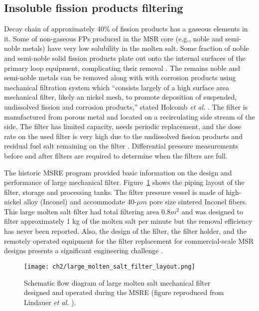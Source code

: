 \subsection{Insoluble fission products filtering}
Decay chain of approximately 40\% of fission products has a gaseous elements 
in it. Some of non-gaseous \glspl{FP} produced in the \gls{MSR} core (e.g., 
noble and semi-noble metals) have very low solubility in the molten salt. Some 
fraction of noble and semi-noble solid fission products plate out onto the 
internal surfaces of the primary loop equipment, complicating their removal 
\cite{briggs_molten-salt_1964}. The remains noble and semi-noble metals can be 
removed along with with corrosion products using mechanical filtration system 
which ``consists largely of a high surface area mechanical filter, likely an 
nickel mesh, to promote deposition of suspended, undissolved fission and 
corrosion products,'' stated Holcomb \emph{et al.} 
\cite{holcomb_instrumentation_2018}. The filter is manufactured from porous 
metal and located on a recirculating side stream of the side. The filter has 
limited capacity, needs periodic replacement, and the dose rate on the used 
filter is very high due to the undissolved fission products and residual 
fuel salt remaining on the filter \cite{mcfarlane_review_2019-1}. Differential 
pressure measurements before and after filters are required to determine when 
the filters are full. 

The historic \gls{MSRE} program provided basic information on the design and 
performance of large mechanical filter. Figure~\ref{fig:large_filter_layout} 
shows the piping layout of the filter, storage and processing tanks. The 
filter pressure vessel is made of high-nickel alloy (Inconel) and accommodate 
40-$\mu m$ pore size sintered Inconel fibers. This large molten salt filter 
had total filtering area 0.8${m^2}$ and was designed to filter approximately 
1 kg of the molten salt per minute but the removal efficiency has never been 
reported. Also, the design of the filter, the filter holder, and the 
remotely operated equipment for the filter replacement for commercial-scale 
\gls{MSR} designs presents a significant engineering challenge 
\cite{mcfarlane_review_2019-1}.
\begin{figure}[htp!] %
	\centering
	\texttt{[image: ch2/large\_molten\_salt\_filter\_layout.png]}
	\caption{Schematic flow diagram of large molten salt mechanical filter 
		designed and operated during the \gls{MSRE} (figure reproduced from 
		Lindauer \emph{et al.} \cite{lindauer_design_1969}).}
	\label{fig:large_filter_layout}
\end{figure}

